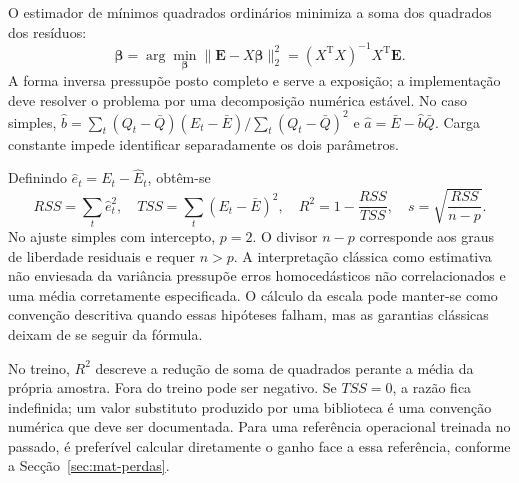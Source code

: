 O estimador de mínimos quadrados ordinários minimiza a soma dos quadrados dos resíduos:
\begin{equation}
\widehat{\boldsymbol\beta}
=\arg\min_{\boldsymbol\beta}\|\boldsymbol E-X\boldsymbol\beta\|_2^2
=(X^{\mathrm T}X)^{-1}X^{\mathrm T}\boldsymbol E.
\label{eq:mat-ols}
\end{equation}
A forma inversa pressupõe posto completo e serve a exposição; a implementação deve resolver o problema por uma decomposição numérica estável. No caso simples, $\widehat b=\sum_t(Q_t-\bar Q)(E_t-\bar E)/\sum_t(Q_t-\bar Q)^2$ e $\widehat a=\bar E-\widehat b\bar Q$. Carga constante impede identificar separadamente os dois parâmetros.

Definindo $\widehat e_t=E_t-\widehat E_t$, obtêm-se
\begin{equation}
RSS=\sum_t\widehat e_t^2,
\quad TSS=\sum_t(E_t-\bar E)^2,
\quad R^2=1-\frac{RSS}{TSS},
\quad s=\sqrt{\frac{RSS}{n-p}}.
\label{eq:mat-rss-escala}
\end{equation}
No ajuste simples com intercepto, $p=2$. O divisor $n-p$ corresponde aos graus de liberdade residuais e requer $n>p$. A interpretação clássica como estimativa não enviesada da variância pressupõe erros homocedásticos não correlacionados e uma média corretamente especificada. O cálculo da escala pode manter-se como convenção descritiva quando essas hipóteses falham, mas as garantias clássicas deixam de se seguir da fórmula.

No treino, $R^2$ descreve a redução de soma de quadrados perante a média da própria amostra. Fora do treino pode ser negativo. Se $TSS=0$, a razão fica indefinida; um valor substituto produzido por uma biblioteca é uma convenção numérica que deve ser documentada. Para uma referência operacional treinada no passado, é preferível calcular diretamente o ganho face a essa referência, conforme a Secção~\ref{sec:mat-perdas}.


